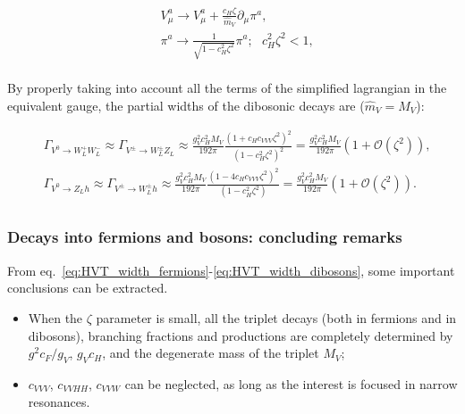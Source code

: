 \begin{equation}
\begin{split}
 & V_{\mu}^a \rightarrow V_{\mu}^a + \frac{c_H \zeta}{\hat{m}_V} \partial_{\mu} \pi^a,\\
 & \pi^a \rightarrow \frac{1}{\sqrt{1 - c_H^2 \zeta^2}} \pi^a; \mbox{ } c_H^2 \zeta^2 < 1,\\
\end{split}
\label{eq:field_redef}
\end{equation}

\noindent By properly taking into account all the terms of the simplified lagrangian in the equivalent gauge, the partial widths of the dibosonic decays are ($\hat{m}_V = M_V$):

\begin{equation}
\begin{split}
 & \Gamma_{V^0 \rightarrow W^+_L W^-_L} \approx \Gamma_{V^{\pm} \rightarrow W^{\pm}_L Z_L} \approx \frac{g_V^2 c_H^2 M_V}{192 \pi} \frac{ \left( 1 + c_H c_{VVV} \zeta^2 \right)^2 }{ \left( 1 - c_H^2 \zeta^2\right)^2 } = \frac{g_V^2 c_H^2 M_V}{192 \pi} \left( 1 + \mathcal{O}(\zeta^2) \right),\\
 & \Gamma_{V^0 \rightarrow Z_L h} \approx \Gamma_{V^{\pm} \rightarrow W^{\pm}_L h} \approx \frac{g_V^2 c_H^2 M_V}{192 \pi} \frac{ \left( 1 - 4 c_H c_{VVV} \zeta^2 \right)^2 }{ \left( 1 - c_H^2 \zeta^2\right) } = \frac{g_V^2 c_H^2 M_V}{192 \pi} \left( 1 + \mathcal{O}(\zeta^2) \right).\\
\end{split}
\label{eq:HVT_width_dibosons}
\end{equation}

\subsubsection{Decays into fermions and bosons: concluding remarks}
\label{sec:theory_remarks}
From eq.~\ref{eq:HVT_width_fermions}-\ref{eq:HVT_width_dibosons}, some important conclusions can be extracted.
\begin{itemize}
\item When the $\zeta$ parameter is small, all the triplet decays (both in fermions and in dibosons), branching fractions and productions are completely determined by $g^2 c_F /g_V$, $g_V c_H$, and the degenerate mass of the triplet $M_V$;
\item $c_{VVV}$, $c_{VVHH}$, $c_{VVW}$ can be neglected, as long as the interest is focused in narrow resonances.
\end{itemize}

